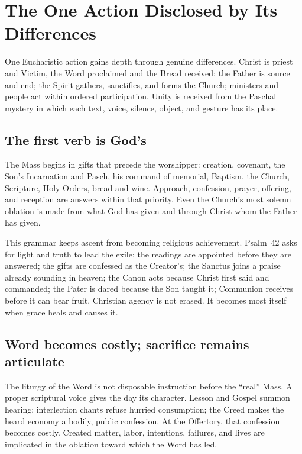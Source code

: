 \section{The One Action Disclosed by Its Differences}

One Eucharistic action gains depth through genuine differences. Christ is priest and Victim, the Word proclaimed and the Bread received; the Father is source and end; the Spirit gathers, sanctifies, and forms the Church; ministers and people act within ordered participation. Unity is received from the Paschal mystery in which each text, voice, silence, object, and gesture has its place.

\subsection{The first verb is God's}

The Mass begins in gifts that precede the worshipper: creation, covenant, the Son's Incarnation and Pasch, his command of memorial, Baptism, the Church, Scripture, Holy Orders, bread and wine. Approach, confession, prayer, offering, and reception are answers within that priority. Even the Church's most solemn oblation is made from what God has given and through Christ whom the Father has given.

This grammar keeps ascent from becoming religious achievement. Psalm~42 asks for light and truth to lead the exile; the readings are appointed before they are answered; the gifts are confessed as the Creator's; the Sanctus joins a praise already sounding in heaven; the Canon acts because Christ first said and commanded; the Pater is dared because the Son taught it; Communion receives before it can bear fruit. Christian agency is not erased. It becomes most itself when grace heals and causes it.

\subsection{Word becomes costly; sacrifice remains articulate}

The liturgy of the Word is not disposable instruction before the ``real'' Mass. A proper scriptural voice gives the day its character. Lesson and Gospel summon hearing; interlection chants refuse hurried consumption; the Creed makes the heard economy a bodily, public confession. At the Offertory, that confession becomes costly. Created matter, labor, intentions, failures, and lives are implicated in the oblation toward which the Word has led.

